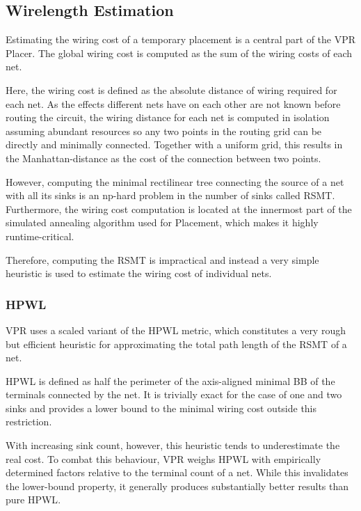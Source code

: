 \subsection{Wirelength Estimation}

Estimating the wiring cost of a temporary placement is a central part of the \gls{VPR} Placer. The global wiring cost is computed as the sum of the wiring costs of each net.

Here, the wiring cost is defined as the absolute distance of wiring required for each net. As the effects different nets have on each other are not known before routing the circuit, the wiring distance for each net is computed in isolation assuming abundant resources so any two points in the routing grid can be directly and minimally connected. Together with a uniform grid, this results in the Manhattan-distance as the cost of the connection between two points.

However, computing the minimal rectilinear tree connecting the source of a net with all its sinks is an np-hard problem in the number of sinks called \gls{RSMT}\cite{rsmt-complexity}. Furthermore, the wiring cost computation is located at the innermost part of the simulated annealing algorithm used for Placement, which makes it highly runtime-critical.

Therefore, computing the \gls{RSMT} is impractical and instead a very simple heuristic is used to estimate the wiring cost of individual nets.

\subsubsection{\gls{HPWL}}

\gls{VPR} uses a scaled variant of the \gls{HPWL} metric, which constitutes a very rough but efficient heuristic for approximating the total path length of the \gls{RSMT} of a net.

\gls{HPWL} is defined as half the perimeter of the axis-aligned minimal \gls{BB} of the terminals connected by the net. It is trivially exact for the case of one and two sinks and provides a lower bound to the minimal wiring cost outside this restriction. 

With increasing sink count, however, this heuristic tends to underestimate the real cost. To combat this behaviour, \gls{VPR} weighs \gls{HPWL} with empirically determined factors relative to the terminal count of a net. While this invalidates the lower-bound property, it generally produces substantially better results than pure \gls{HPWL}.

